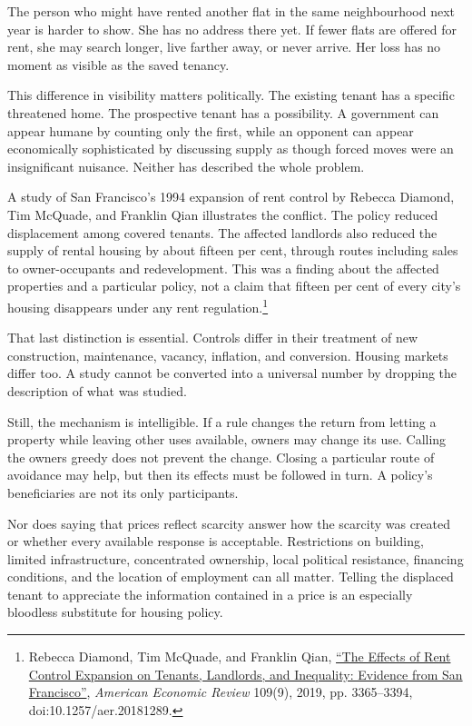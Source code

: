 \documentclass[12pt,a4paper]{book}
\begin{document}
The person who might have rented another flat in the same neighbourhood next year is harder to show. She has no address there yet. If fewer flats are offered for rent, she may search longer, live farther away, or never arrive. Her loss has no moment as visible as the saved tenancy.

This difference in visibility matters politically. The existing tenant has a specific threatened home. The prospective tenant has a possibility. A government can appear humane by counting only the first, while an opponent can appear economically sophisticated by discussing supply as though forced moves were an insignificant nuisance. Neither has described the whole problem.

A study of San Francisco's 1994 expansion of rent control by Rebecca Diamond, Tim McQuade, and Franklin Qian illustrates the conflict. The policy reduced displacement among covered tenants. The affected landlords also reduced the supply of rental housing by about fifteen per cent, through routes including sales to owner-occupants and redevelopment. This was a finding about the affected properties and a particular policy, not a claim that fifteen per cent of every city's housing disappears under any rent regulation.\footnote{Rebecca Diamond, Tim McQuade, and Franklin Qian, \href{https://www.aeaweb.org/articles?id=10.1257/aer.20181289}{``The Effects of Rent Control Expansion on Tenants, Landlords, and Inequality: Evidence from San Francisco''}, \emph{American Economic Review} 109(9), 2019, pp. 3365--3394, doi:10.1257/aer.20181289.}

That last distinction is essential. Controls differ in their treatment of new construction, maintenance, vacancy, inflation, and conversion. Housing markets differ too. A study cannot be converted into a universal number by dropping the description of what was studied.

Still, the mechanism is intelligible. If a rule changes the return from letting a property while leaving other uses available, owners may change its use. Calling the owners greedy does not prevent the change. Closing a particular route of avoidance may help, but then its effects must be followed in turn. A policy's beneficiaries are not its only participants.

Nor does saying that prices reflect scarcity answer how the scarcity was created or whether every available response is acceptable. Restrictions on building, limited infrastructure, concentrated ownership, local political resistance, financing conditions, and the location of employment can all matter. Telling the displaced tenant to appreciate the information contained in a price is an especially bloodless substitute for housing policy.
\end{document}
